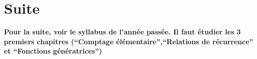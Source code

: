 
 \newpage 
 \newpage

\section{Suite}

\textbf{Pour la suite, voir le syllabus de l'année passée. Il faut étudier les 3 premiers chapitres (``Comptage élémentaire'',``Relations de récurrence'' et ``Fonctions génératrices'')}